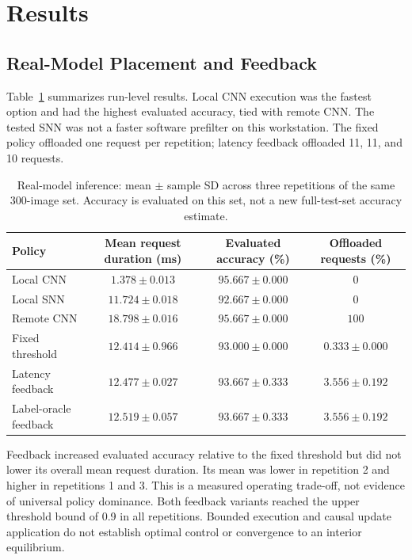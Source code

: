 \documentclass[journal]{IEEEtran}
\begin{document}
\section{Results}
\label{sec:results}
\subsection{Real-Model Placement and Feedback}
Table~\ref{tab:inference} summarizes run-level results. Local CNN execution was the fastest option and had the highest evaluated accuracy, tied with remote CNN. The tested SNN was not a faster software prefilter on this workstation. The fixed policy offloaded one request per repetition; latency feedback offloaded 11, 11, and 10 requests.

\begin{table}[!t]
\centering
\caption{Real-model inference: mean $\pm$ sample SD across three repetitions of the same 300-image set. Accuracy is evaluated on this set, not a new full-test-set accuracy estimate.}
\label{tab:inference}
\begin{tabular}{lccc}
\toprule
Policy & Mean request duration (ms) & Evaluated accuracy (\%) & Offloaded requests (\%)\\
\midrule
Local CNN & $1.378\pm0.013$ & $95.667\pm0.000$ & $0$\\
Local SNN & $11.724\pm0.018$ & $92.667\pm0.000$ & $0$\\
Remote CNN & $18.798\pm0.016$ & $95.667\pm0.000$ & $100$\\
Fixed threshold & $12.414\pm0.966$ & $93.000\pm0.000$ & $0.333\pm0.000$\\
Latency feedback & $12.477\pm0.027$ & $93.667\pm0.333$ & $3.556\pm0.192$\\
Label-oracle feedback & $12.519\pm0.057$ & $93.667\pm0.333$ & $3.556\pm0.192$\\
\bottomrule
\end{tabular}
\end{table}

Feedback increased evaluated accuracy relative to the fixed threshold but did not lower its overall mean request duration. Its mean was lower in repetition 2 and higher in repetitions 1 and 3. This is a measured operating trade-off, not evidence of universal policy dominance. Both feedback variants reached the upper threshold bound of 0.9 in all repetitions. Bounded execution and causal update application do not establish optimal control or convergence to an interior equilibrium.
\end{document}
